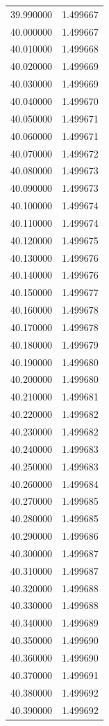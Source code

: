\begin{tabular}{rr}
39.990000 & 1.499667 \\
40.000000 & 1.499667 \\
40.010000 & 1.499668 \\
40.020000 & 1.499669 \\
40.030000 & 1.499669 \\
40.040000 & 1.499670 \\
40.050000 & 1.499671 \\
40.060000 & 1.499671 \\
40.070000 & 1.499672 \\
40.080000 & 1.499673 \\
40.090000 & 1.499673 \\
40.100000 & 1.499674 \\
40.110000 & 1.499674 \\
40.120000 & 1.499675 \\
40.130000 & 1.499676 \\
40.140000 & 1.499676 \\
40.150000 & 1.499677 \\
40.160000 & 1.499678 \\
40.170000 & 1.499678 \\
40.180000 & 1.499679 \\
40.190000 & 1.499680 \\
40.200000 & 1.499680 \\
40.210000 & 1.499681 \\
40.220000 & 1.499682 \\
40.230000 & 1.499682 \\
40.240000 & 1.499683 \\
40.250000 & 1.499683 \\
40.260000 & 1.499684 \\
40.270000 & 1.499685 \\
40.280000 & 1.499685 \\
40.290000 & 1.499686 \\
40.300000 & 1.499687 \\
40.310000 & 1.499687 \\
40.320000 & 1.499688 \\
40.330000 & 1.499688 \\
40.340000 & 1.499689 \\
40.350000 & 1.499690 \\
40.360000 & 1.499690 \\
40.370000 & 1.499691 \\
40.380000 & 1.499692 \\
40.390000 & 1.499692 \\

\end{tabular}

